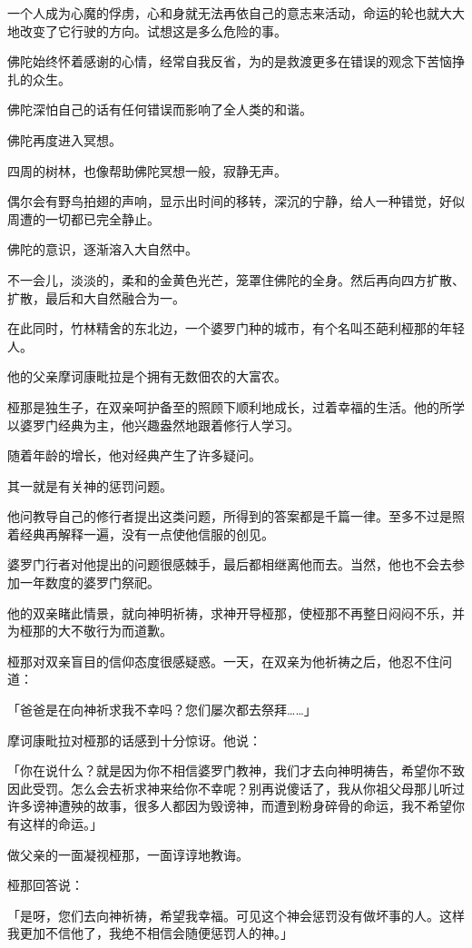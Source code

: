 \documentclass[twoside,openany]{book}
\begin{document}
一个人成为心魔的俘虏，心和身就无法再依自己的意志来活动，命运的轮也就大大地改变了它行驶的方向。试想这是多么危险的事。

佛陀始终怀着感谢的心情，经常自我反省，为的是救渡更多在错误的观念下苦恼挣扎的众生。

佛陀深怕自己的话有任何错误而影响了全人类的和谐。

佛陀再度进入冥想。

四周的树林，也像帮助佛陀冥想一般，寂静无声。

偶尔会有野鸟拍翅的声响，显示出时间的移转，深沉的宁静，给人一种错觉，好似周遭的一切都已完全静止。

佛陀的意识，逐渐溶入大自然中。

不一会儿，淡淡的，柔和的金黄色光芒，笼罩住佛陀的全身。然后再向四方扩散、扩散，最后和大自然融合为一。

在此同时，竹林精舍的东北边，一个婆罗门种的城市，有个名叫丕葩利\textperiodcentered 桠那的年轻人。

他的父亲摩诃康毗拉是个拥有无数佃农的大富农。

桠那是独生子，在双亲呵护备至的照顾下顺利地成长，过着幸福的生活。他的所学以婆罗门经典为主，他兴趣盎然地跟着修行人学习。

随着年龄的增长，他对经典产生了许多疑问。

其一就是有关神的惩罚问题。

他问教导自己的修行者提出这类问题，所得到的答案都是千篇一律。至多不过是照着经典再解释一遍，没有一点使他信服的创见。

婆罗门行者对他提出的问题很感棘手，最后都相继离他而去。当然，他也不会去参加一年数度的婆罗门祭祀。

他的双亲睹此情景，就向神明祈祷，求神开导桠那，使桠那不再整日闷闷不乐，并为桠那的大不敬行为而道歉。

桠那对双亲盲目的信仰态度很感疑惑。一天，在双亲为他祈祷之后，他忍不住问道：

「爸爸是在向神祈求我不幸吗？您们屡次都去祭拜……」

摩诃康毗拉对桠那的话感到十分惊讶。他说：

「你在说什么？就是因为你不相信婆罗门教神，我们才去向神明祷告，希望你不致因此受罚。怎么会去祈求神来给你不幸呢？别再说傻话了，我从你祖父母那儿听过许多谤神遭殃的故事，很多人都因为毁谤神，而遭到粉身碎骨的命运，我不希望你有这样的命运。」

做父亲的一面凝视桠那，一面谆谆地教诲。

桠那回答说：

「是呀，您们去向神祈祷，希望我幸福。可见这个神会惩罚没有做坏事的人。这样我更加不信他了，我绝不相信会随便惩罚人的神。」
\end{document}
